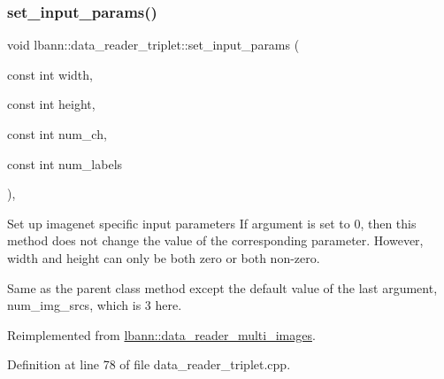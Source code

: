 \subsubsection{\texorpdfstring{set\+\_\+input\+\_\+params()}{set\_input\_params()}}
{\footnotesize\ttfamily void lbann\+::data\+\_\+reader\+\_\+triplet\+::set\+\_\+input\+\_\+params (\begin{DoxyParamCaption}\item[{const int}]{width,  }\item[{const int}]{height,  }\item[{const int}]{num\+\_\+ch,  }\item[{const int}]{num\+\_\+labels }\end{DoxyParamCaption})\hspace{0.3cm}{\ttfamily [override]}, {\ttfamily [virtual]}}

Set up imagenet specific input parameters If argument is set to 0, then this method does not change the value of the corresponding parameter. However, width and height can only be both zero or both non-\/zero.

Same as the parent class method except the default value of the last argument, num\+\_\+img\+\_\+srcs, which is 3 here. 

Reimplemented from \hyperlink{classlbann_1_1data__reader__multi__images_afdb403556ed04a9142932e89ac60435e}{lbann\+::data\+\_\+reader\+\_\+multi\+\_\+images}.



Definition at line 78 of file data\+\_\+reader\+\_\+triplet.\+cpp.


